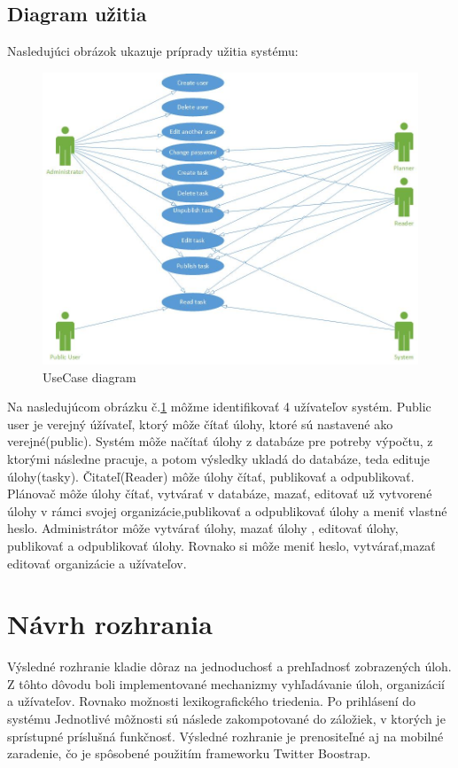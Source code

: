 \subsection{Diagram užitia}
Nasledujúci obrázok ukazuje príprady užitia systému:
\begin{figure}[htb]

\begin{center}

\includegraphics[scale=0.5]{UseCase.jpg} 
\caption{UseCase diagram}
\label{use}

\end{center}

\end{figure}
Na nasledujúcom obrázku č.\ref{use} môžme identifikovať 4 užívateľov systém. Public user je verejný úžívateľ, ktorý môže čítať úlohy, ktoré sú nastavené ako verejné(public). Systém môže načítať úlohy z databáze pre potreby výpočtu, z ktorými následne pracuje, a potom výsledky ukladá do databáze, teda edituje úlohy(tasky). Čitateľ(Reader) môže úlohy čítať, publikovať a odpublikovať. Plánovač môže úlohy čítať, vytvárať v databáze, mazať, editovať už vytvorené úlohy v rámci svojej organizácie,publikovať a odpublikovať úlohy a meniť vlastné heslo. Administrátor môže vytvárať úlohy, mazať úlohy , editovať úlohy, publikovať a odpublikovať úlohy. Rovnako si môže meniť heslo, vytvárať,mazať editovať organizácie a užívateľov.




\section{Návrh rozhrania}
Výsledné rozhranie kladie dôraz na jednoduchosť a prehľadnosť zobrazených úloh. Z tôhto dôvodu boli implementované mechanizmy vyhľadávanie úloh, organizácií a užívateľov. Rovnako možnosti lexikografického triedenia. Po prihlásení do systému Jednotlivé môžnosti sú následe zakompotované do záložiek, v ktorých je sprístupné príslušná funkčnosť. Výsledné rozhranie je prenositeľné aj na mobilné zaradenie, čo je spôsobené použitím frameworku Twitter Boostrap.


